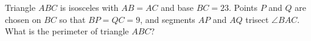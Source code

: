 Triangle $ABC$ is isosceles with $AB=AC$ and base $BC=23$. Points $P$ and $Q$ are chosen on $BC$ so that $BP=QC=9$, and segments $AP$ and $AQ$ trisect $\angle BAC$. What is the perimeter of triangle $ABC$?
